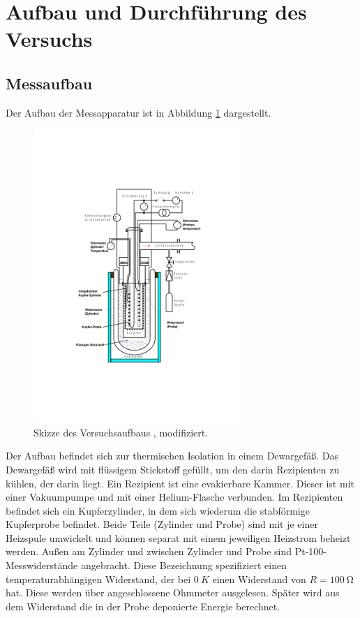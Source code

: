 \section{Aufbau und Durchführung des Versuchs}
\subsection{Messaufbau}
Der Aufbau der Messapparatur ist in Abbildung \ref{fig:aufbau} dargestellt.
\begin{figure}[!ht]
	\centering
	\includegraphics[width=0.7\textwidth]{content/images/aufbau.pdf}
    \caption{Skizze des Versuchsaufbaus \cite{anleitung}, modifiziert.}
    \label{fig:aufbau}
\end{figure}
Der Aufbau befindet sich zur thermischen Isolation in einem Dewargefäß.
Das Dewargefäß wird mit flüssigem Stickstoff gefüllt, um den darin Rezipienten zu kühlen, der darin liegt.
Ein Rezipient ist eine evakierbare Kammer.
Dieser ist mit einer Vakuumpumpe und mit einer Helium-Flasche verbunden.
Im Rezipienten befindet sich ein Kupferzylinder, in dem sich wiederum die stabförmige Kupferprobe befindet.
Beide Teile (Zylinder und Probe) sind mit je einer Heizspule umwickelt und können separat mit einem jeweiligen Heizstrom beheizt werden.
Außen am Zylinder und zwischen Zylinder und Probe sind Pt-100-Messwiderstände angebracht.
Diese Bezeichnung spezifiziert einen temperaturabhängigen Widerstand, der bei $\SI{0}{K}$ einen Widerstand von $R = \SI{100}{\ohm}$ hat.
Diese werden über angeschlossene Ohmmeter ausgelesen.
Später wird aus dem Widerstand die in der Probe deponierte Energie berechnet.


